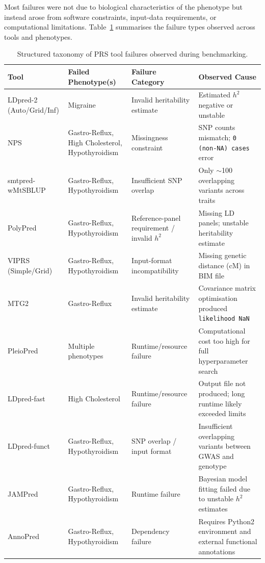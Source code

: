 \documentclass[pdflatex,sn-basic]{sn-jnl}
\begin{document}
Most failures were not due to biological characteristics of the phenotype but instead arose from software constraints, input-data requirements, or computational limitations. Table~\ref{tab:prs_tool_failures} summarises the failure types observed across tools and phenotypes.

\begin{table}[ht]
\centering
\caption{Structured taxonomy of PRS tool failures observed during benchmarking.}
\label{tab:prs_tool_failures}
\begin{tabular}{llll}
\hline
\textbf{Tool} & \textbf{Failed Phenotype(s)} & \textbf{Failure Category} & \textbf{Observed Cause} \\
\hline
LDpred-2 (Auto/Grid/Inf) & Migraine & Invalid heritability estimate & Estimated $h^2$ negative or unstable \\
NPS & Gastro-Reflux, High Cholesterol, Hypothyroidism & Missingness constraint & SNP counts mismatch; \texttt{0 (non-NA) cases} error \\
smtpred-wMtSBLUP & Gastro-Reflux, Hypothyroidism & Insufficient SNP overlap & Only $\sim$100 overlapping variants across traits \\
PolyPred & Gastro-Reflux, Hypothyroidism & Reference-panel requirement / invalid $h^2$ & Missing LD panels; unstable heritability estimate \\
VIPRS (Simple/Grid) & Gastro-Reflux, Hypothyroidism & Input-format incompatibility & Missing genetic distance (cM) in BIM file \\
MTG2 & Gastro-Reflux & Invalid heritability estimate & Covariance matrix optimisation produced \texttt{likelihood NaN} \\
PleioPred & Multiple phenotypes & Runtime/resource failure & Computational cost too high for full hyperparameter search \\
LDpred-fast & High Cholesterol & Runtime/resource failure & Output file not produced; long runtime likely exceeded limits \\
LDpred-funct & Gastro-Reflux, Hypothyroidism & SNP overlap / input format & Insufficient overlapping variants between GWAS and genotype \\
JAMPred & Gastro-Reflux, Hypothyroidism & Runtime failure & Bayesian model fitting failed due to unstable $h^2$ estimates \\
AnnoPred & Gastro-Reflux, Hypothyroidism & Dependency failure & Requires Python2 environment and external functional annotations \\
\hline
\end{tabular}
\end{table}
\end{document}
